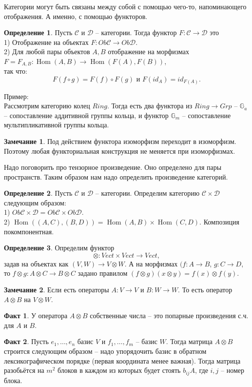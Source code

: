 \documentclass[10pt,a4paper,oneside]{book}
\theoremstyle{definition}
\newtheorem*{rem}{Замечание}
\newtheorem{defn}{Определение}
\newtheorem*{fact}{Факт}
\newcommand{\mb}[1]{\mathbb{#1}}
\newcommand{\mc}[1]{\mathcal{#1}}
\newcommand{\Hom}{\operatorname{Hom}}
\def\dfn{\begin{defn}}
\def\edfn{\end{defn}}
\def\rm{\begin{rem}}
\def\erm{\end{rem}}
\def\fct{\begin{fact}}
\def\efct{\end{fact}}
\begin{document}
Категории могут быть связаны между собой с помощью чего-то, напоминающего отображения. А именно, с помощью функторов.

\dfn
Пусть $\mc C$ и $\mc D$ -- категории. Тогда функтор $F\colon \mc C \to \mc D$ это\\
1) Отображение на объектах $F \colon Ob \mc C \to Ob \mc D$.\\
2) Для любой пары объектов $A,B$ отображение на морфизмах $F=F_{A,B} \colon \Hom(A,B) \to \Hom(F(A),F(B))$,\\
так что:
$$F(f \circ g)=F(f)\circ F(g) \text{ и } F(id_A)=id_{F(A)}.$$
\edfn

Пример:\\
Рассмотрим категорию колец $Ring$. Тогда есть два функтора из  $Ring \to Grp$ -- $\mb G_a$ -- сопоставление аддитивной группы кольца, и функтор $\mb G_m$ -- сопоставление мультипликативной группы кольца.\\

\rm Под действием функтора изоморфизм переходит в изоморфизм. Поэтому любая функториальная конструкция не меняется при изоморфизмах. \erm

Надо поговорить про тензорное произведение. Оно определено для пары пространств. Таким образом нам надо определить произведение категорий.

\dfn Пусть $\mc C$ и $\mc D$ -- категории. Определим категорию $\mc C \times \mc D$ следующим образом:\\
1) $Ob \mc C \times \mc D = Ob \mc C \times Ob \mc D$.\\
2) $ \Hom((A,C), (B,D))= \Hom(A,B) \times \Hom(C,D)$. Композиция покомпонентная.
\edfn

\dfn Определим функтор 
$$\otimes \colon Vect \times Vect \to Vect,$$
задав на объектах как $(V,W) \to V \otimes W$. А на морфизмах $(f \colon A \to B$,  $g \colon C \to D $, то $f\otimes g \colon A\otimes C \to B \otimes C $ задано правилом $(f\otimes g) (x\otimes y) = f(x)\otimes f(y)$.
\edfn

\rm Если есть операторы $A\colon V \to V$ и $B \colon W \to W$. То есть оператор $A\otimes B$ на $V\otimes W$. \erm

\fct У оператора $A\otimes B$ собственные числа -- это попарные произведения с.ч. для $A$ и $B$. \efct

\fct Пусть $e_1,\dots, e_n$ базис $V$ и $f_1,\dots, f_m$ -- базис $W$. Тогда матрица  $A\otimes B$ строится следующим образом -- надо упорядочить базис в обратном лексикографическом порядке (первая координата менее важная). Тогда матрица разобьётся на $m^2$ блоков в каждом из которых будет стоять $b_{ij} A$, где $i,j$ -- номер блока.
\efct 
\end{document}
